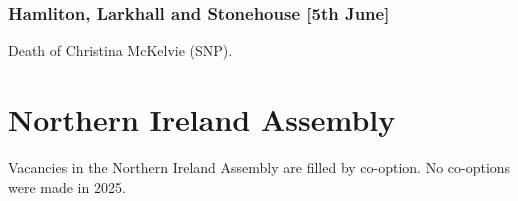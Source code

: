 \documentclass[a4paper,openany]{book}
\begin{document}
\subsubsection*{Hamliton, Larkhall and Stonehouse \hspace*{\fill}\nolinebreak[1]%
\enspace\hspace*{\fill}
[5th June]}


Death of Christina McKelvie (SNP).
%

%
%

\section{Northern Ireland Assembly}

Vacancies in the Northern Ireland Assembly are filled by co-option.
No co-options were made in 2025.
%
\end{document}
